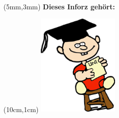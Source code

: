 \thispagestyle{empty}

\begin{textblock*}{10cm}(5mm,3mm)
    \normalsize \textbf{Dieses Inforz gehört:}
\end{textblock*}

\begin{textblock*}{4cm}(10cm,1cm)
    \includegraphics[width=4cm]{../grafik/wesen/wesen_uni}
\end{textblock*}
